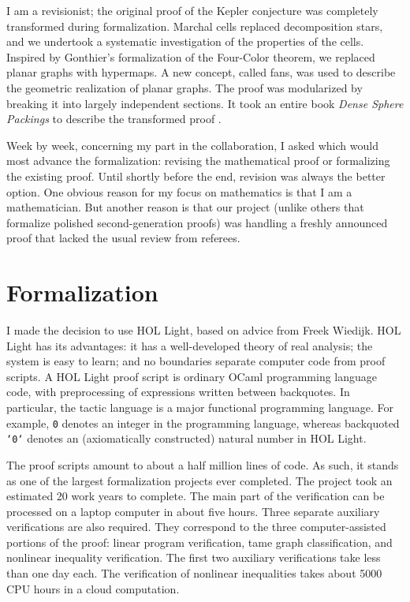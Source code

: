 \documentclass{amsart}
\begin{document}
I am a revisionist; the original proof of the Kepler conjecture was
completely transformed during formalization. Marchal cells replaced
decomposition stars, and we undertook a systematic investigation of
the properties of the cells.  Inspired by Gonthier's formalization of
the Four-Color theorem, we replaced planar graphs with hypermaps.  A
new concept, called fans, was used to describe the geometric
realization of planar graphs.  The proof was modularized by breaking
it into largely independent sections.  It took an entire book
\emph{Dense Sphere Packings} to describe the transformed proof \cite{DSP}.

Week by week, concerning my part in the collaboration, I asked which
would most advance the formalization: revising the mathematical proof
or formalizing the existing proof.  Until shortly before the end,
revision was always the better option.  One obvious reason for my
focus on mathematics is that I am a mathematician.  But another reason
is that our project (unlike others that formalize polished
second-generation proofs) was handling a freshly announced proof that
lacked the usual review from referees.

\section{Formalization}


I made the decision to use HOL Light, based on advice from Freek
Wiedijk.  HOL Light has its advantages: it has a well-developed theory
of real analysis; the system is easy to learn; and no boundaries
separate computer code from proof scripts.  A HOL Light proof script
is ordinary OCaml programming language code, with preprocessing of
expressions written between backquotes.  In particular, the tactic
language is a major functional programming language.  For example,
{\tt 0} denotes an integer in the programming language, whereas backquoted
{\tt `0`} denotes an (axiomatically constructed) natural number in HOL
Light.


The proof scripts amount to about a half million lines of code.  As
such, it stands as one of the largest formalization projects ever
completed.  The project took an estimated 20 work years to complete.
The main part of the verification can be processed on a laptop
computer in about five hours.  Three separate auxiliary verifications
are also required. They correspond to the three computer-assisted
portions of the proof: linear program verification, tame graph
classification, and nonlinear inequality verification.  The first two
auxiliary verifications take less than one day each.  The verification
of nonlinear inequalities takes about 5000 CPU hours in a cloud
computation.
\end{document}
